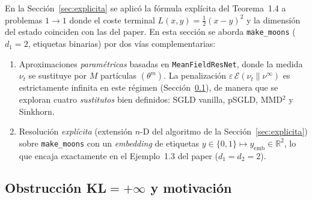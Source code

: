 \documentclass[11pt, a4paper]{article}
\theoremstyle{definition}
\newcommand{\eps}{\varepsilon}
\begin{document}
En la Sección~\ref{sec:explicita} se aplicó la fórmula explícita
del Teorema~1.4 a problemas $1\!\to\!1$ donde el coste terminal
$L(x,y)=\tfrac12(x-y)^2$ y la dimensión del estado coinciden con
las del paper. En esta sección se aborda
\texttt{make\_moons} ($d_1=2$, etiquetas binarias) por dos vías
complementarias:
\begin{enumerate}
  \item[(A)] Aproximaciones \emph{paramétricas} basadas en
        \texttt{MeanFieldResNet}, donde la medida $\nu_t$ se
        sustituye por $M$ partículas $(\theta^m)$. La penalización
        $\eps\,\mathcal E(\nu_t\|\nu^\infty)$ es estrictamente
        infinita en este régimen (Sección~\ref{sec:reg-moons-kl}),
        de manera que se exploran cuatro \emph{sustitutos} bien
        definidos: SGLD vanilla, pSGLD, MMD$^2$ y Sinkhorn.
  \item[(B)] Resolución \emph{explícita} (extensión $n$-D del
        algoritmo de la Sección~\ref{sec:explicita}) sobre
        \texttt{make\_moons} con un \emph{embedding} de etiquetas
        $y\in\{0,1\}\mapsto y_{\text{emb}}\in\mathbb{R}^2$, lo que
        encaja exactamente en el Ejemplo~1.3 del paper
        ($d_1=d_2=2$).
\end{enumerate}

\subsection{Obstrucción KL$=+\infty$ y motivación}
\label{sec:reg-moons-kl}
\end{document}
